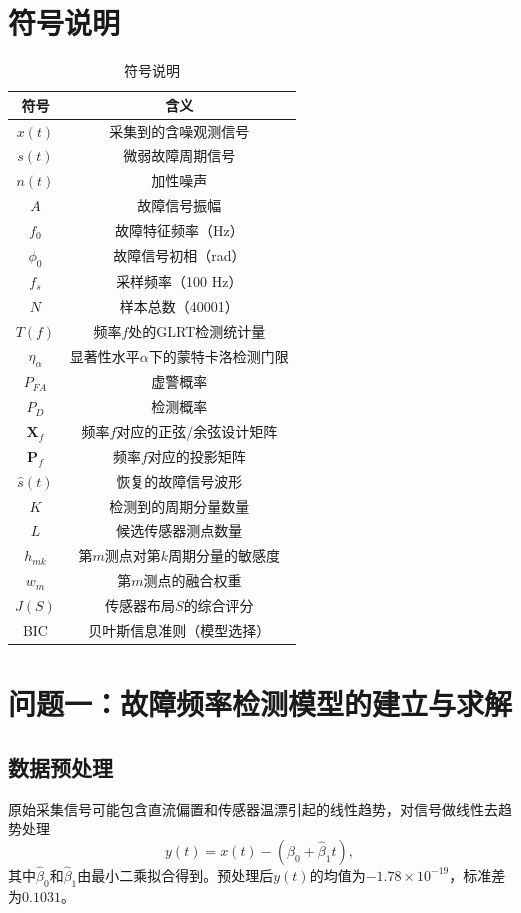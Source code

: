 \documentclass[withoutpreface,bwprint]{cumcmthesis}
\begin{document}
\section{符号说明}
\begin{longtable}{cc}
    \caption{符号说明}\label{tab:notation} \\
    \toprule[1.5pt]
    符号 & 含义\\
    \midrule[1pt]
    $x(t)$ & 采集到的含噪观测信号\\
    $s(t)$ & 微弱故障周期信号\\
    $n(t)$ & 加性噪声\\
    $A$ & 故障信号振幅\\
    $f_0$ & 故障特征频率（Hz）\\
    $\phi_0$ & 故障信号初相（rad）\\
    $f_s$ & 采样频率（100 Hz）\\
    $N$ & 样本总数（40001）\\
    $T(f)$ & 频率$f$处的GLRT检测统计量\\
    $\eta_\alpha$ & 显著性水平$\alpha$下的蒙特卡洛检测门限\\
    $P_{FA}$ & 虚警概率\\
    $P_D$ & 检测概率\\
    $\mathbf{X}_f$ & 频率$f$对应的正弦/余弦设计矩阵\\
    $\mathbf{P}_f$ & 频率$f$对应的投影矩阵\\
    $\hat{s}(t)$ & 恢复的故障信号波形\\
    $K$ & 检测到的周期分量数量\\
    $L$ & 候选传感器测点数量\\
    $h_{mk}$ & 第$m$测点对第$k$周期分量的敏感度\\
    $w_m$ & 第$m$测点的融合权重\\
    $J(S)$ & 传感器布局$S$的综合评分\\
    BIC & 贝叶斯信息准则（模型选择）\\
    \bottomrule[1.5pt]
\end{longtable}

\section{问题一：故障频率检测模型的建立与求解}

\subsection{数据预处理}
原始采集信号可能包含直流偏置和传感器温漂引起的线性趋势，对信号做线性去趋势处理
\begin{equation}
y(t) = x(t) - (\hat{\beta}_0 + \hat{\beta}_1 t),
\label{eq:detrend}
\end{equation}
其中$\hat{\beta}_0$和$\hat{\beta}_1$由最小二乘拟合得到。预处理后$y(t)$的均值为$-1.78 \times 10^{-19}$，标准差为$0.1031$。
\end{document}
